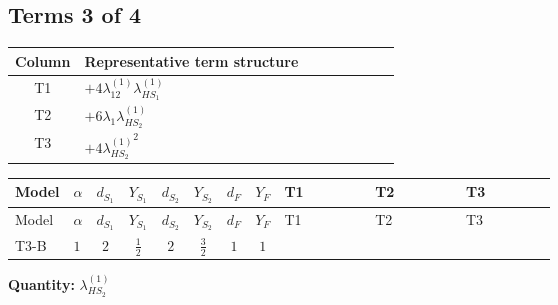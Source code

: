 \documentclass[8pt]{article}
\begin{document}
\begin{landscape}
\subsection*{Terms 3 of 4}
\begin{center}
\begin{tabular}{@{}c >{\raggedright\arraybackslash}p{0.82\linewidth}@{}}
\toprule
Column & Representative term structure \\
\midrule
T1 & \(\displaystyle +4 {\lambda_{12}^{(1)}} {\lambda_{HS_1}^{(1)}}\) \\
\midrule
T2 & \(\displaystyle +6 {\lambda_1} {\lambda_{HS_2}^{(1)}}\) \\
\midrule
T3 & \(\displaystyle +4 {\lambda_{HS_2}^{(1)}}^2\) \\
\midrule
\bottomrule
\end{tabular}
\end{center}
\smallskip
\tiny
\begin{longtable}{@{}llcccccc >{\raggedright\arraybackslash}p{0.21\linewidth} >{\raggedright\arraybackslash}p{0.21\linewidth} >{\raggedright\arraybackslash}p{0.21\linewidth}@{}}
\toprule
Model & $\alpha$ & $d_{S_1}$ & $Y_{S_1}$ & $d_{S_2}$ & $Y_{S_2}$ & $d_F$ & $Y_F$ & T1 & T2 & T3 \\
\midrule
\endfirsthead
\toprule
Model & $\alpha$ & $d_{S_1}$ & $Y_{S_1}$ & $d_{S_2}$ & $Y_{S_2}$ & $d_F$ & $Y_F$ & T1 & T2 & T3 \\
\midrule
\endhead
T3-B & $1$ & $2$ & $\frac{1}{2}$ & $2$ & $\frac{3}{2}$ & $1$ & $1$ & \scriptsize\adjustbox{max width=\linewidth}{$\begin{gathered} +4 {\lambda_{12}^{(1)}} {\lambda_{HS_1}^{(1)}}\end{gathered}$} & \scriptsize\adjustbox{max width=\linewidth}{$\begin{gathered} +6 {\lambda_1} {\lambda_{HS_2}^{(1)}}\end{gathered}$} & \scriptsize\adjustbox{max width=\linewidth}{$\begin{gathered} +4 {\lambda_{HS_2}^{(1)}}^2\end{gathered}$} \\
\midrule
\bottomrule
\end{longtable}
\clearpage
\noindent\textbf{Quantity: }$\lambda_{HS_2}^{(1)}$\par\smallskip

\end{landscape}
\end{document}
